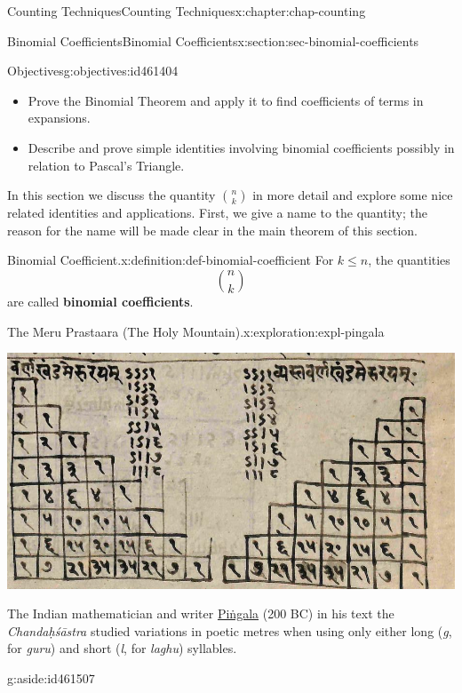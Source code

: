 \documentclass[oneside,10pt,]{book}
\newcommand{\terminology}[1]{\textbf{#1}}
\newcommand{\pubtitle}[1]{\textsl{#1}}
\numberwithin{equation}{section}
\begin{document}
\begin{chapterptx}{Counting Techniques}{}{Counting Techniques}{}{}{x:chapter:chap-counting}
\begin{sectionptx}{Binomial Coefficients}{}{Binomial Coefficients}{}{}{x:section:sec-binomial-coefficients}
\begin{objectives}{Objectives}{g:objectives:id461404}
%
\begin{itemize}[label=\textbullet]
\item{}Prove the Binomial Theorem and apply it to find coefficients of terms in expansions.%
\item{}Describe and prove simple identities involving binomial coefficients possibly in relation to Pascal's Triangle.%
\end{itemize}
\end{objectives}
In this section we discuss the quantity \(\displaystyle\binom{n}{k}\) in more detail and explore some nice related identities and applications. First, we give a name to the quantity; the reason for the name will be made clear in the main theorem of this section.%
\begin{definition}{Binomial Coefficient.}{x:definition:def-binomial-coefficient}%
For \(k \leq n\), the quantities%
\begin{equation*}
\binom{n}{k}
\end{equation*}
are called \terminology{binomial coefficients}.%
\end{definition}
\begin{exploration}{The Meru Prastaara (The Holy Mountain).}{x:exploration:expl-pingala}%
\begin{sidebyside}{1}{0.175}{0.175}{0}%
\begin{sbspanel}{0.65}%
\includegraphics[width=\linewidth]{figs/meru-prastaara.png}
\end{sbspanel}%
\end{sidebyside}%
\par
The Indian mathematician and writer \href{https://en.wikipedia.org/wiki/Pingala}{Piṅgala} (200 BC) in his text the \pubtitle{Chandaḥśāstra} studied variations in poetic metres when using only either long (\emph{g}, for \emph{guru}) and short (\emph{l}, for \emph{laghu}) syllables.%
\begin{aside}{}{g:aside:id461507}%

\end{aside}
\end{exploration}
\end{sectionptx}
\end{chapterptx}
\end{document}
